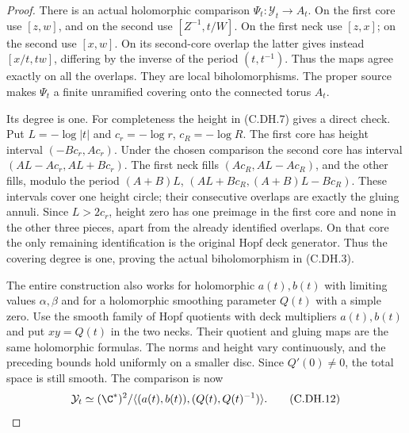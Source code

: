 \begin{proof}
There is an actual
holomorphic comparison
$\Psi_t:\mathcal Y_t\to A_t$.
On the first core use
$[z,w]$, and on the
second use $[Z^{-1},t/W]$.
On the first neck use
$[z,x]$; on the second
use $[x,w]$. On its
second-core overlap
the latter gives instead
$[x/t,tw]$, differing by
the inverse of the period
$(t,t^{-1})$. Thus the
maps agree exactly on
all the overlaps. They
are local biholomorphisms.
The proper source makes
$\Psi_t$ a finite
unramified covering
onto the connected
torus $A_t$.

Its degree is one.
For completeness the
height in (C.DH.7)
gives a direct check.
Put $L=-\log|t|$ and
$c_r=-\log r$, $c_R=-\log R$.
The first core has
height interval
$(-Bc_r,Ac_r)$.
Under the chosen comparison
the second core has interval
$(AL-Ac_r,AL+Bc_r)$.
The first neck fills
$(Ac_R,AL-Ac_R)$,
and the other fills,
modulo the period
$(A+B)L$,
$(AL+Bc_R,(A+B)L-Bc_R)$.
These intervals cover
one height circle;
their consecutive
overlaps are exactly
the gluing annuli.
Since $L>2c_r$,
height zero has one
preimage in the first
core and none in the
other three pieces,
apart from the already
identified overlaps.
On that core the only
remaining identification
is the original Hopf
deck generator. Thus
the covering degree
is one, proving the
actual biholomorphism
in (C.DH.3).

The entire construction
also works for holomorphic
$a(t),b(t)$ with limiting
values $\alpha,\beta$
and for a holomorphic
smoothing parameter $Q(t)$
with a simple zero.
Use the smooth family
of Hopf quotients with
deck multipliers $a(t),b(t)$
and put $xy=Q(t)$ in
the two necks. Their
quotient and gluing maps
are the same holomorphic
formulas. The norms and
height vary continuously,
and the preceding bounds
hold uniformly on a
smaller disc. Since
$Q'(0)\ne0$, the total
space is still smooth.
The comparison is now
\[
 \mathcal Y_t\simeq
 (\C^*)^2/
       \langle(a(t),b(t)),(Q(t),Q(t)^{-1})\rangle.
                                                               \tag{C.DH.12}
\]


\end{proof}
